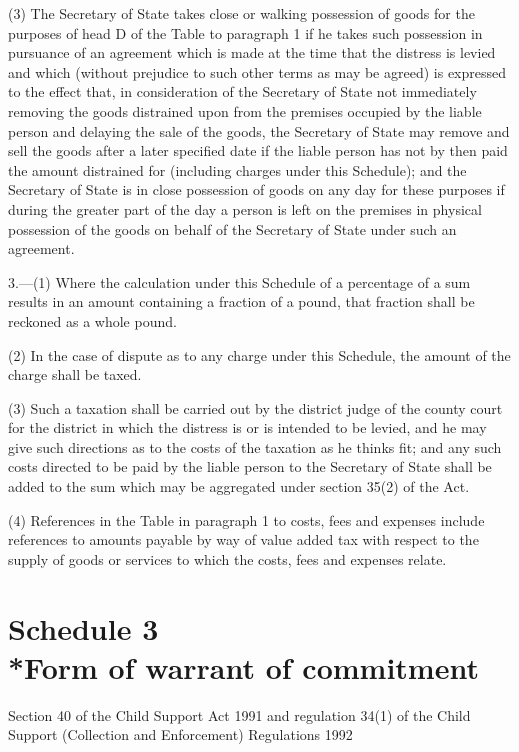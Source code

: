 \documentclass[a4paper]{article}
\newcommand{\parthead}{}
\begin{document}
(3) The Secretary of State takes close or walking possession of goods for the purposes of head D of the Table to paragraph 1 if he takes such possession in pursuance of an agreement which is made at the time that the distress is levied and which (without prejudice to such other terms as may be agreed) is expressed to the effect that, in consideration of the Secretary of State not immediately removing the goods distrained upon from the premises occupied by the liable person and delaying the sale of the goods, the Secretary of State may remove and sell the goods after a later specified date if the liable person has not by then paid the amount distrained for (including charges under this Schedule); and the Secretary of State is in close possession of goods on any day for these purposes if during the greater part of the day a person is left on the premises in physical possession of the goods on behalf of the Secretary of State under such an agreement.

\medskip

3.—(1) Where the calculation under this Schedule of a percentage of a sum results in an amount containing a fraction of a pound, that fraction shall be reckoned as a whole pound.

(2) In the case of dispute as to any charge under this Schedule, the amount of the charge shall be taxed.

(3) Such a taxation shall be carried out by the district judge of the county court for the district in which the distress is or is intended to be levied, and he may give such directions as to the costs of the taxation as he thinks fit; and any such costs directed to be paid by the liable person to the Secretary of State shall be added to the sum which may be aggregated under section 35(2) of the Act.

(4) References in the Table in paragraph 1 to costs, fees and expenses include references to amounts payable by way of value added tax with respect to the supply of goods or services to which the costs, fees and expenses relate.

\part[Schedule 3 --- Form of warrant of commitment]{Schedule 3\\*Form of warrant of commitment}

\renewcommand\parthead{--- Schedule 3}

\noindent
Section 40 of the Child Support Act 1991 and regulation 34(1) of the Child Support (Collection and Enforcement) Regulations 1992
\end{document}
